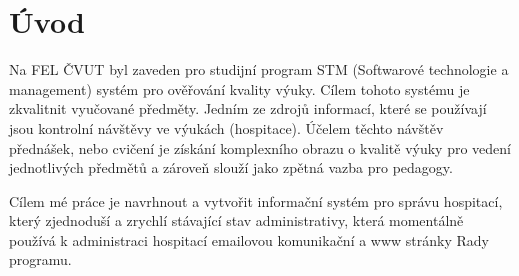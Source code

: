 \chapter{Úvod}

Na FEL ČVUT byl zaveden pro studijní program STM (Softwarové technologie a management) systém pro ověřování kvality výuky. Cílem tohoto systému je zkvalitnit vyučované předměty. Jedním ze zdrojů informací, které se používají jsou kontrolní návštěvy ve výukách (hospitace). Účelem těchto návštěv přednášek, nebo cvičení je získání komplexního obrazu o kvalitě výuky pro vedení jednotlivých předmětů a zároveň slouží jako zpětná vazba pro pedagogy. 

Cílem mé práce je navrhnout a vytvořit informační systém pro správu hospitací, který zjednoduší a zrychlí stávající stav administrativy, která momentálně používá k administraci hospitací emailovou komunikační a www stránky Rady programu.